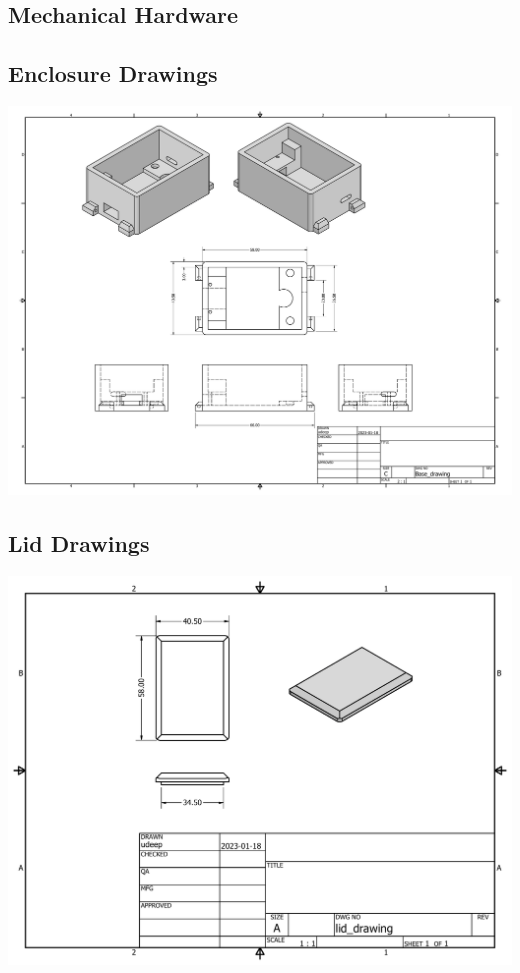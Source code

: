 \documentclass[12pt, titlepage]{article}
\begin{document}
\begin{appendices}
  \section{Mechanical Hardware}
  \label{appendix:hardware}
\subsection{Enclosure Drawings}
  \begin{center}
	\label{appendix:hardware:enclosureDWG}
  \includegraphics[width=\textwidth,height=\textheight,keepaspectratio]{Base_drawing.pdf}
\end{center}
\subsection{Lid Drawings}
	\label{appendix:hardware:lidDWG}

  \includegraphics[width=\textwidth,height=\textheight,keepaspectratio]{Lid_drawing.pdf}

\end{appendices}
\end{document}
